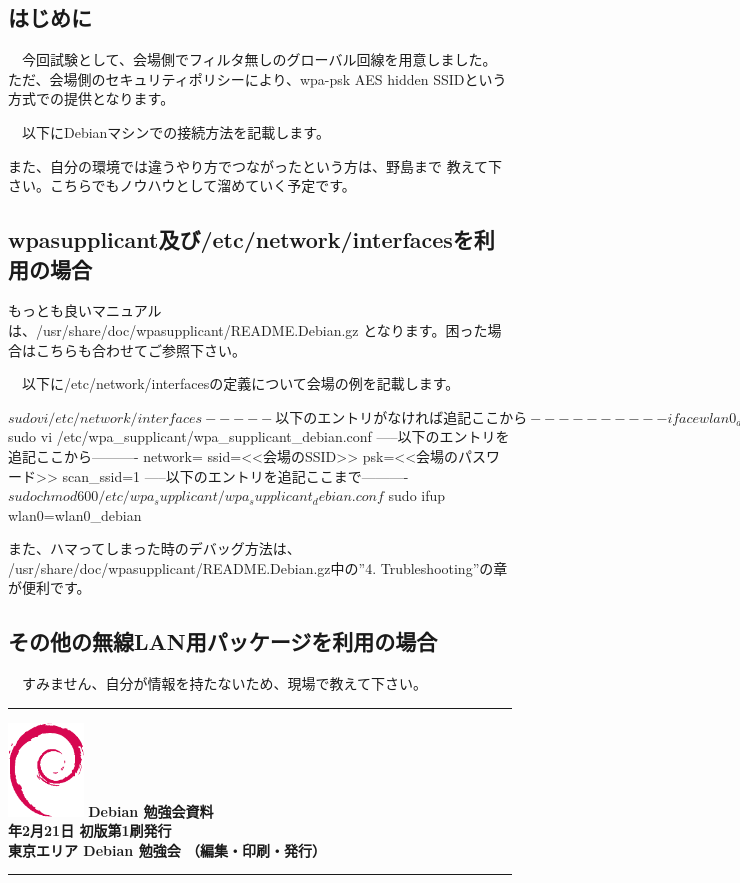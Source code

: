 \documentclass[mingoth,a4paper]{jsarticle}
\newcommand{\debmtgyear}{2015}
\newcommand{\debmtgmonth}{2}
\newcommand{\debmtgdate}{21}
\begin{document}
 \subsection{はじめに}

　今回試験として、会場側でフィルタ無しのグローバル回線を用意しました。
ただ、会場側のセキュリティポリシーにより、wpa-psk AES hidden SSIDという
方式での提供となります。

　以下にDebianマシンでの接続方法を記載します。

 また、自分の環境では違うやり方でつながったという方は、野島まで
教えて下さい。こちらでもノウハウとして溜めていく予定です。

 \subsection{wpasupplicant及び/etc/network/interfacesを利用の場合}

 もっとも良いマニュアルは、/usr/share/doc/wpasupplicant/README.Debian.gz
となります。困った場合はこちらも合わせてご参照下さい。

　以下に/etc/network/interfacesの定義について会場の例を記載します。

\begin{commandline}
$ sudo vi /etc/network/interfaces
-----以下のエントリがなければ追記ここから----------
iface wlan0_debian inet dhcp
     wpa-conf /etc/wpa_supplicant/wpa_supplicant_debian.conf
-----以下のエントリがなければ追記ここまで----------
$ sudo vi /etc/wpa_supplicant/wpa_supplicant_debian.conf
-----以下のエントリを追記ここから----------
network={
     ssid=<<会場のSSID>>
     psk=<<会場のパスワード>>
     scan_ssid=1
}
-----以下のエントリを追記ここまで----------
$ sudo chmod 600 /etc/wpa_supplicant/wpa_supplicant_debian.conf
$ sudo ifup wlan0=wlan0_debian
\end{commandline}

 また、ハマってしまった時のデバッグ方法は、
/usr/share/doc/wpasupplicant/README.Debian.gz中の''4. Trubleshooting''の章が便利です。

 \subsection{その他の無線LAN用パッケージを利用の場合}

　すみません、自分が情報を持たないため、現場で教えて下さい。

\cleartooddpage

\vspace*{15cm}
\hrule
\vspace{2mm}
\includegraphics[width=2cm]{image200502/openlogo-nd.eps}
\noindent \Large \bf Debian 勉強会資料\\
\noindent \normalfont \debmtgyear{}年\debmtgmonth{}月\debmtgdate{}日 \hspace{5mm}  初版第1刷発行\\
\noindent \normalfont 東京エリア Debian 勉強会 （編集・印刷・発行）\\
\hrule
\end{document}
